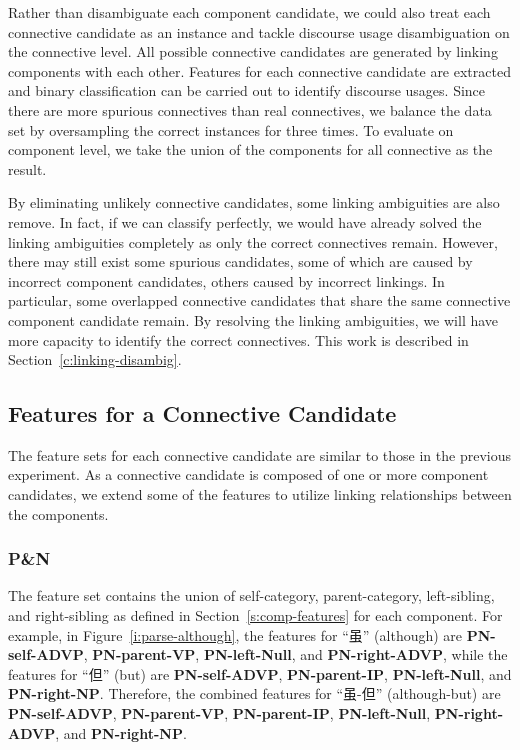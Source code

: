 Rather than disambiguate each component candidate, we could also treat each connective
candidate as an instance and tackle discourse usage disambiguation on the connective
level. All possible connective candidates are  generated by linking components with
each other. Features for each connective candidate are extracted and binary
classification can be carried out to identify discourse usages.
Since there are more spurious connectives than real connectives, we balance the
data set by oversampling the correct instances for three times. To evaluate on
component level, we take the union of the components for all connective as the result.

By eliminating unlikely connective candidates, some linking ambiguities 
are also remove. In fact, if we can classify perfectly, we would have already
solved the linking ambiguities completely as only the correct connectives remain.
However, there may still exist some spurious candidates, some of which are
caused by incorrect component candidates, others caused by
incorrect linkings.
In particular, some overlapped connective candidates that share the same
connective component candidate remain. By resolving the linking
ambiguities, we will have more capacity to identify the correct connectives. This
work is described in Section~\ref{c:linking-disambig}.

\subsection{Features for a Connective Candidate}
\label{c:connective-features}

The feature sets for each connective candidate are similar to those in the previous
experiment. As a connective candidate is composed of one or more component candidates,
we extend some of the features to utilize linking relationships between the
components.

\subsubsection{P\&N}

The feature set contains the union of self-category, parent-category, left-sibling,
and right-sibling as defined in Section~\ref{s:comp-features} for each component.
For example, in Figure~\ref{i:parse-although}, the features for ``虽'' (although) are
\textbf{PN-self-ADVP}, \textbf{PN-parent-VP}, \textbf{PN-left-Null}, and \textbf{PN-right-ADVP}, while
the features for ``但'' (but) are \textbf{PN-self-ADVP}, \textbf{PN-parent-IP}, \textbf{PN-left-Null},
and \textbf{PN-right-NP}. Therefore, the combined features for ``虽-但'' (although-but) are
\textbf{PN-self-ADVP}, \textbf{PN-parent-VP}, \textbf{PN-parent-IP}, \textbf{PN-left-Null},
\textbf{PN-right-ADVP}, and \textbf{PN-right-NP}.



